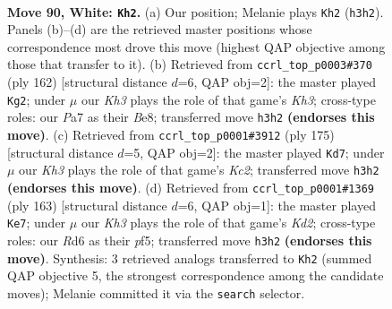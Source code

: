 \documentclass[11pt]{article}
\begin{document}
\clearpage

\begin{figure}[p]\centering
\begin{subfigure}{0.46\textwidth}\centering
\resizebox{\linewidth}{!}{%
\newchessgame
\chessboard[
  setfen={5r1k/P7/3R4/8/8/7K/8/8 w - - 49 90},
  showmover=false,
  pgfstyle=straightmove, color=movearrow, markmove={h3-h2}
]}
\caption{}
\end{subfigure}\hfill
\begin{subfigure}{0.46\textwidth}\centering
\resizebox{\linewidth}{!}{%
\newchessgame
\chessboard[
  setfen={4B3/8/5r2/8/5k2/7K/8/8 w - - 1 82},
  showmover=false,
  pgfstyle=straightmove, color=movearrow, markmove={h3-g2}
]}
\caption{}
\end{subfigure}
\\[4pt]
\begin{subfigure}{0.46\textwidth}\centering
\resizebox{\linewidth}{!}{%
\newchessgame
\chessboard[
  setfen={8/2k5/4p3/8/5P2/3K4/6r1/3R4 b - - 4 88},
  showmover=false,
  pgfstyle=straightmove, color=movearrow, markmove={c7-d7}
]}
\caption{}
\end{subfigure}\hfill
\begin{subfigure}{0.46\textwidth}\centering
\resizebox{\linewidth}{!}{%
\newchessgame
\chessboard[
  setfen={R7/3k4/8/5P2/K7/8/8/8 b - - 0 82},
  showmover=false,
  pgfstyle=straightmove, color=movearrow, markmove={d7-e7}
]}
\caption{}
\end{subfigure}
\caption{\textbf{Move 90, White: \texttt{Kh2}.} (a) Our position; Melanie plays \texttt{Kh2} (\texttt{h3h2}). Panels (b)--(d) are the retrieved master positions whose correspondence most drove this move (highest QAP objective among those that transfer to it). (b) Retrieved from \texttt{ccrl\_top\_p0003\#370} (ply 162) [structural distance $d$=6, QAP obj=2]: the master played \texttt{Kg2}; under $\mu$ our \emph{Kh3} plays the role of that game's \emph{Kh3}; cross-type roles: our \emph{P}a7 as their \emph{B}e8; transferred move \texttt{h3h2} \textbf{(endorses this move)}. (c) Retrieved from \texttt{ccrl\_top\_p0001\#3912} (ply 175) [structural distance $d$=5, QAP obj=2]: the master played \texttt{Kd7}; under $\mu$ our \emph{Kh3} plays the role of that game's \emph{Kc2}; transferred move \texttt{h3h2} \textbf{(endorses this move)}. (d) Retrieved from \texttt{ccrl\_top\_p0001\#1369} (ply 163) [structural distance $d$=6, QAP obj=1]: the master played \texttt{Ke7}; under $\mu$ our \emph{Kh3} plays the role of that game's \emph{Kd2}; cross-type roles: our \emph{R}d6 as their \emph{p}f5; transferred move \texttt{h3h2} \textbf{(endorses this move)}. Synthesis: 3 retrieved analogs transferred to \texttt{Kh2} (summed QAP objective 5, the strongest correspondence among the candidate moves); Melanie committed it via the \texttt{search} selector.}
\label{fig:thought-m178}
\end{figure}
\end{document}
